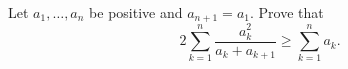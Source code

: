 Let $a_1, \ldots, a_n$ be positive and $a_{n+1} = a_1$. Prove that
\[ 2\sum_{k=1}^n \frac{a_k^2}{a_k + a_{k+1}} \geq \sum_{k=1}^n a_k. \]
